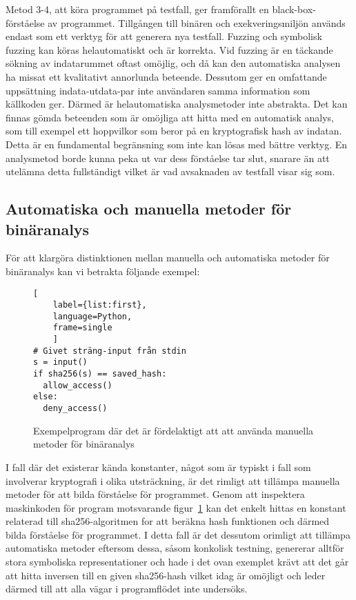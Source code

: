 Metod 3-4, att köra programmet på testfall, ger framförallt en
black-box-förståelse av programmet. Tillgången till binären och
exekveringsmiljön används endast som ett verktyg för att generera nya testfall.
Fuzzing och symbolisk fuzzing kan köras helautomatiskt och är korrekta.
Vid fuzzing är en täckande sökning av indatarummet oftast omöjlig, och då kan
den automatiska analysen ha missat ett kvalitativt annorlunda beteende. Dessutom
ger en omfattande uppsättning indata-utdata-par inte användaren samma
information som källkoden ger. Därmed är helautomatiska analysmetoder inte
abstrakta. Det kan finnas gömda beteenden som är omöjliga att hitta med en automatisk
analys, som till exempel ett hoppvilkor som beror på en kryptografisk hash av indatan.
Detta är en fundamental begränsning som inte kan lösas med bättre verktyg.
En analysmetod borde kunna peka ut var dess förståelse tar slut, snarare än att
utelämna detta fullständigt vilket är vad avsaknaden av testfall visar sig som.


\subsection{Automatiska och manuella metoder för binäranalys}
För att klargöra distinktionen mellan manuella och automatiska metoder för
binäranalys kan vi betrakta följande exempel:

\begin{figure}[H]
    \begin{lstlisting}[
    label={list:first},
    language=Python,
    frame=single
    ]
# Givet sträng-input från stdin
s = input()
if sha256(s) == saved_hash:
  allow_access()
else:
  deny_access()
\end{lstlisting}
    \caption{Exempelprogram där det är fördelaktigt att att använda manuella metoder för binäranalys}
    \label{fig:manual_method_example}
\end{figure}

I fall där det existerar kända konstanter, något som är typiskt i fall som
involverar kryptografi i olika utsträckning, är det rimligt att tillämpa
manuella metoder för att bilda förståelse för programmet. Genom att inspektera
maskinkoden för program motsvarande figur~\ref{fig:manual_method_example} kan
det enkelt hittas en konstant relaterad till sha256-algoritmen for att beräkna
hash funktionen och därmed bilda förståelse för programmet. I detta fall är det
dessutom orimligt att tillämpa automatiska metoder eftersom dessa, såsom
konkolisk testning, genererar alltför stora symboliska representationer och hade
i det ovan exemplet krävt att det går att hitta inversen till en given
sha256-hash vilket idag är omöjligt och leder därmed till att alla vägar i
programflödet inte undersöks.

